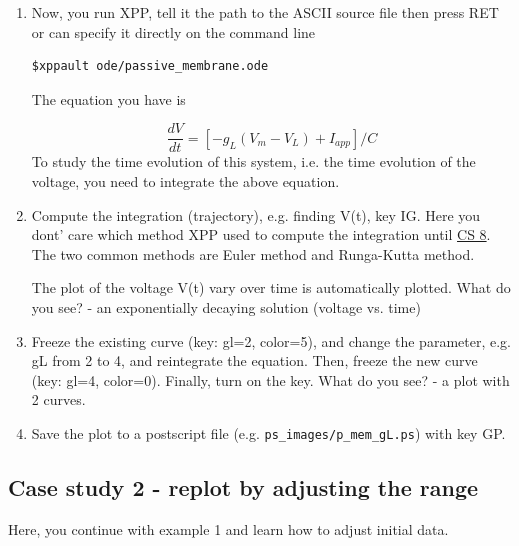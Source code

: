 \begin{enumerate}
\item Now, you run XPP, tell it the path to the ASCII source file then press
RET or can specify it directly on the command line

\begin{verbatim}
$xppault ode/passive_membrane.ode
\end{verbatim}

The equation you have is

\begin{equation}
  \label{eq:123}
  \frac{dV}{dt} = \left[ -g_L(V_m-V_L) + I_{app} \right]/C
\end{equation}
To study the time evolution of this system, i.e.  the time evolution
of the voltage, you need to integrate the above equation.

\item Compute the integration (trajectory), e.g. finding V(t), key
  IG. Here you dont' care which method XPP used to compute the
  integration until \hyperref[sec:case-study-8]{CS 8}. The two common
  methods are Euler method and Runga-Kutta method.

  The plot of the voltage V(t) vary over time is automatically
  plotted.  What do you see? - an exponentially decaying solution
  (voltage vs. time)

\item Freeze the existing curve (key: gl=2, color=5), and change the
  parameter, e.g. gL from 2 to 4, and reintegrate the equation. Then,
  freeze the new curve (key: gl=4, color=0). Finally, turn on the
  key. What do you see?  - a plot with 2 curves.

\item Save the plot to a postscript file
  (e.g. \verb!ps_images/p_mem_gL.ps!) with key GP.
\end{enumerate}


\subsection{Case study 2 - replot by adjusting the range}
\label{sec:case-study-2}

Here, you continue with example 1 and learn how to adjust initial data.

